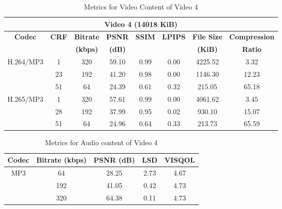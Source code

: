     \begin{table}[H]
        \centering
        \caption{Metrics for Video Content of Video 4}
        \label{table:vid-met-4}
        \begin{tabular}{|c|c|c|c|c|c|c|c|}
        \hline
        \multicolumn{8}{|c|}{\textbf{Video 4 (14018 KiB)}} \\ \hline
        \multirow{2}{*}{\textbf{Codec}} & \multirow{2}{*}{\textbf{CRF}} & \textbf{Bitrate} & \textbf{PSNR} & \textbf{SSIM} & \textbf{LPIPS} & \textbf{File Size} & \textbf{Compression} \\ 
        &  & \textbf{(kbps)} & \textbf{(dB)} &  &  & \textbf{(KiB)} & \textbf{Ratio} \\ \hline
        \multirow{3}{*}{H.264/MP3} & 1  & 320 & 59.10 & 0.99 & 0.00 & 4225.52 & 3.32 \\ \cline{2-8} 
                                   & 23 & 192 & 41.20 & 0.98 & 0.00 & 1146.30 & 12.23 \\ \cline{2-8} 
                                   & 51 & 64  & 24.39 & 0.61 & 0.32 & 215.05  & 65.18 \\ \hline
        \multirow{3}{*}{H.265/MP3} & 1  & 320 & 57.61 & 0.99 & 0.00 & 4061.62 & 3.45 \\ \cline{2-8} 
                                   & 28 & 192 & 37.99 & 0.95 & 0.02 & 930.10  & 15.07 \\ \cline{2-8} 
                                   & 51 & 64  & 24.96 & 0.64 & 0.33 & 213.73  & 65.59 \\ \hline
        \end{tabular}
    \end{table}


    \begin{table}[H]
        \centering
        \caption{Metrics for Audio content of Video 4}
        \label{table:aud-met-4}
        \begin{tabular}{|c|c|c|c|c|}
        \hline
        \textbf{Codec} & \textbf{Bitrate (kbps)} & \textbf{PSNR (dB)} & \textbf{LSD} & \textbf{VISQOL} \\ \hline
        \multirow{3}{*}{MP3} & 64  & 28.25 & 2.73 & 4.67 \\ \cline{2-5} 
                                   & 192 & 41.05 & 0.42 & 4.73 \\ \cline{2-5} 
                                   & 320 & 64.38 & 0.11 & 4.73 \\ \hline
        \end{tabular}
    \end{table}
    

